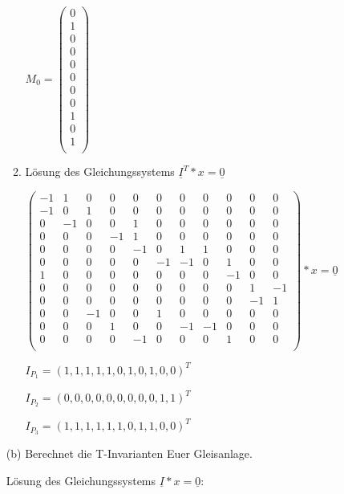 \documentclass{scrreprt}
\begin{document}
\begin{enumerate}
\begin{enumerate}
\( M_0 = \begin{pmatrix}
0 \\ %
1 \\ %
0 \\ %
0 \\ %
0 \\ %
0 \\ %
0 \\ %
0 \\ %
1 \\ %
0 \\ %
1 \\ %
\end{pmatrix} \)

\item Lösung des Gleichungssystems \( \underline{I}^T * x = \underline{0} \)

\( \begin{pmatrix}
-1 & 1 & 0 & 0 & 0 & 0 & 0 & 0 & 0 & 0 & 0  \\
-1 & 0 & 1 & 0 & 0 & 0 & 0 & 0 & 0 & 0 & 0  \\
 0 &-1 & 0 & 0 & 1 & 0 & 0 & 0 & 0 & 0 & 0  \\
 0 & 0 & 0 &-1 & 1 & 0 & 0 & 0 & 0 & 0 & 0  \\
 0 & 0 & 0 & 0 &-1 & 0 & 1 & 1 & 0 & 0 & 0  \\
 0 & 0 & 0 & 0 & 0 &-1 &-1 & 0 & 1 & 0 & 0  \\
 1 & 0 & 0 & 0 & 0 & 0 & 0 & 0 &-1 & 0 & 0  \\
 0 & 0 & 0 & 0 & 0 & 0 & 0 & 0 & 0 & 1 &-1  \\
 0 & 0 & 0 & 0 & 0 & 0 & 0 & 0 & 0 &-1 & 1  \\
 0 & 0 &-1 & 0 & 0 & 1 & 0 & 0 & 0 & 0 & 0  \\
 0 & 0 & 0 & 1 & 0 & 0 &-1 &-1 & 0 & 0 & 0  \\
 0 & 0 & 0 & 0 &-1 & 0 & 0 & 0 & 1 & 0 & 0  \\
\end{pmatrix} * x = \underline{0}\)

$I_{P_1} = (1, 1, 1, 1, 1, 0, 1, 0, 1, 0, 0)^T$

$I_{P_2} = (0, 0, 0, 0, 0, 0, 0, 0, 0, 1, 1)^T$

$I_{P_3} = (1, 1, 1, 1, 1, 1, 0, 1, 1, 0, 0)^T$

\end{enumerate}

(b) Berechnet die T-Invarianten Euer Gleisanlage.

Lösung des Gleichungssystems \( \underline{I} * x = \underline{0} \):


\end{enumerate}
\end{document}
